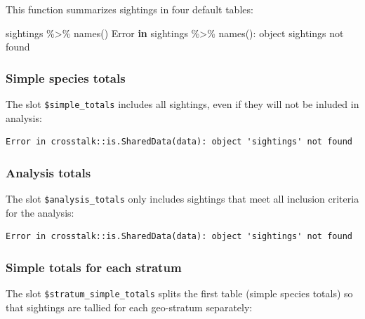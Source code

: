 \documentclass[
]{book}
\newenvironment{Shaded}{\begin{snugshade}}{\end{snugshade}}
\newcommand{\ControlFlowTok}[1]{\textcolor[rgb]{0.13,0.29,0.53}{\textbf{#1}}}
\newcommand{\FunctionTok}[1]{\textcolor[rgb]{0.00,0.00,0.00}{#1}}
\newcommand{\NormalTok}[1]{#1}
\newcommand{\SpecialCharTok}[1]{\textcolor[rgb]{0.00,0.00,0.00}{#1}}
\newcommand{\StringTok}[1]{\textcolor[rgb]{0.31,0.60,0.02}{#1}}
\begin{document}
This function summarizes sightings in four default tables:

\begin{Shaded}
\begin{Highlighting}[]
\NormalTok{sightings }\SpecialCharTok{\%\textgreater{}\%}  \FunctionTok{names}\NormalTok{()}
\NormalTok{Error }\ControlFlowTok{in}\NormalTok{ sightings }\SpecialCharTok{\%\textgreater{}\%} \FunctionTok{names}\NormalTok{()}\SpecialCharTok{:}\NormalTok{ object }\StringTok{\textquotesingle{}sightings\textquotesingle{}}\NormalTok{ not found}
\end{Highlighting}
\end{Shaded}

\hypertarget{simple-species-totals}{%
\subsubsection*{Simple species totals}\label{simple-species-totals}}

The slot \texttt{\$simple\_totals} includes all sightings, even if they will not be inluded in analysis:

\begin{verbatim}
Error in crosstalk::is.SharedData(data): object 'sightings' not found
\end{verbatim}

\hypertarget{analysis-totals}{%
\subsubsection*{Analysis totals}\label{analysis-totals}}

The slot \texttt{\$analysis\_totals} only includes sightings that meet all inclusion criteria for the analysis:

\begin{verbatim}
Error in crosstalk::is.SharedData(data): object 'sightings' not found
\end{verbatim}

\hypertarget{simple-totals-for-each-stratum}{%
\subsubsection*{Simple totals for each stratum}\label{simple-totals-for-each-stratum}}

The slot \texttt{\$stratum\_simple\_totals} splits the first table (simple species totals) so that sightings are tallied for each geo-stratum separately:
\end{document}
